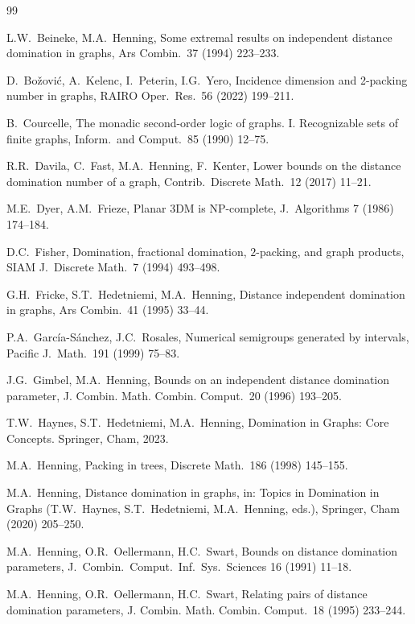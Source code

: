 \documentclass[12pt]{article}
\begin{document}
\begin{thebibliography}{99}

L.W.~Beineke, M.A.~Henning,
Some extremal results on independent distance domination in graphs,
Ars Combin.\ 37 (1994) 223--233.

D.~Bo\v zovi\'c, A.~Kelenc, I.~Peterin, I.G.~Yero,
Incidence dimension and 2-packing number in graphs,
RAIRO Oper.\ Res.\ 56 (2022) 199--211.

B.~Courcelle,
The monadic second-order logic of graphs. I. Recognizable sets of finite graphs,
Inform.\ and Comput.\ 85 (1990) 12--75.

R.R.~Davila, C.~Fast, M.A.~Henning, F.~Kenter, 
Lower bounds on the distance domination number of a graph, 
Contrib.\ Discrete Math.\ 12 (2017) 11--21.

M.E.~Dyer, A.M.~Frieze,
Planar 3DM is NP-complete,
J.\ Algorithms 7 (1986) 174--184.

D.C.~Fisher,
Domination, fractional domination, {$2$}-packing, and graph products,
SIAM J.\ Discrete Math.\ 7 (1994) 493--498. 

G.H.~Fricke, S.T.~Hedetniemi, M.A.~Henning, 
Distance independent domination in graphs,
Ars Combin.\ 41 (1995) 33--44.

P.A.~Garc\' ia-S\' anchez, J.C.~Rosales, 
Numerical semigroups generated by intervals,
Pacific J.\ Math.\ 191 (1999) 75--83.

J.G.~Gimbel, M.A.~Henning,
Bounds on an independent distance domination parameter,
J. Combin. Math. Combin. Comput.\ 20 (1996) 193--205.

T.W.~Haynes, S.T.~Hedetniemi, M.A.~Henning,
Domination in Graphs: Core Concepts.
Springer, Cham, 2023.

M.A.~Henning,
Packing in trees,
Discrete Math.\ 186 (1998) 145--155.

M.A.~Henning, 
Distance domination in graphs, 
in: Topics in Domination in Graphs (T.W.~Haynes, S.T.~Hedetniemi, M.A.~Henning, eds.),
Springer, Cham (2020) 205--250.

M.A.~Henning, O.R.~Oellermann, H.C.~Swart,
Bounds on distance domination parameters,
J.\ Combin.\ Comput.\ Inf.\ Sys.\ Sciences 16 (1991) 11--18.

M.A.~Henning, O.R.~Oellermann, H.C.~Swart,
Relating pairs of distance domination parameters,
J. Combin. Math. Combin. Comput.\ 18 (1995) 233--244.


\end{thebibliography}
\end{document}
